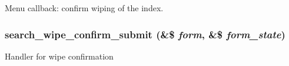 Menu callback: confirm wiping of the index. \hypertarget{search_8admin_8inc_a7853fc11d2c13207839da1f5bad4e8c}{
\subsubsection[{search\_\-wipe\_\-confirm\_\-submit}]{\setlength{\rightskip}{0pt plus 5cm}search\_\-wipe\_\-confirm\_\-submit (\&\$ {\em form}, \/  \&\$ {\em form\_\-state})}}
\label{search_8admin_8inc_a7853fc11d2c13207839da1f5bad4e8c}


Handler for wipe confirmation 